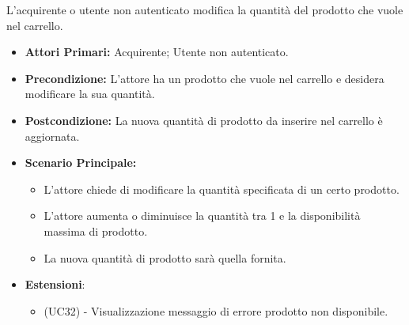 L'acquirente o utente non autenticato modifica la quantità del prodotto che vuole nel carrello.
\begin{itemize}
    \item \textbf{Attori Primari:} Acquirente; Utente non autenticato.
    \item \textbf{Precondizione:} L'attore ha un prodotto che vuole nel carrello e desidera modificare la sua quantità.
    \item \textbf{Postcondizione:} La nuova quantità di prodotto da inserire nel carrello è aggiornata.
    \item \textbf{Scenario Principale:}
        \begin{itemize}
            \item L'attore chiede di modificare la quantità specificata di un certo prodotto.
            \item L'attore aumenta o diminuisce la quantità tra 1 e la disponibilità massima di prodotto.
            \item La nuova quantità di prodotto sarà quella fornita.
        \end{itemize}
    \item \textbf{Estensioni}:
    \begin{itemize}
        \item (UC32) - Visualizzazione messaggio di errore prodotto non disponibile.
    \end{itemize}
\end{itemize}



